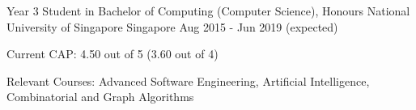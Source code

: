 

\begin{cventries}

  \cventry
  {Year 3 Student in Bachelor of Computing (Computer Science), Honours} %
  {National University of Singapore} %
  {Singapore} %
  {Aug 2015 - Jun 2019 (expected)} %
  {
    \begin{cvitems} %
    \item {Current CAP: 4.50 out of 5 (3.60 out of 4)}
    \item {Relevant Courses: Advanced Software Engineering, Artificial Intelligence, Combinatorial and Graph Algorithms}
    \end{cvitems}
  }

\end{cventries}
